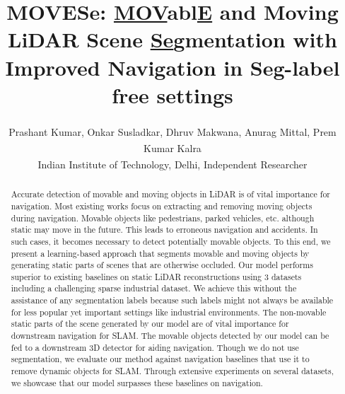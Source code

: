 \documentclass[10pt,twocolumn,letterpaper]{article}
\begin{document}
\title{MOVESe: \underline{MOV}abl\underline{E} and Moving LiDAR Scene \underline{Se}gmentation with Improved Navigation in Seg-label free settings}

\author{Prashant Kumar\textsuperscript{\rm {}}, Onkar Susladkar\textsuperscript{\rm {}}, Dhruv Makwana\textsuperscript{\rm {}}, Anurag Mittal\textsuperscript{\rm {}}, Prem Kumar Kalra\textsuperscript{\rm {}}\\
\textsuperscript{\rm {}}Indian Institute of Technology, Delhi, \textsuperscript{\rm {}}Independent Researcher \\
}

\maketitle
\ificcvfinal\thispagestyle{empty}\fi

\begin{abstract}
Accurate detection of movable and moving objects in LiDAR is of vital importance for navigation. Most existing works focus on extracting and removing moving objects during navigation. Movable objects like pedestrians, parked vehicles, etc. although static may move in the future. This leads to erroneous navigation and accidents. In such cases, it becomes necessary to detect potentially movable objects. To this end, we present a learning-based approach that segments movable and moving objects by generating static parts of scenes that are otherwise occluded. Our model performs superior to existing baselines on static LiDAR reconstructions using 3 datasets including a challenging sparse industrial dataset. We achieve this without the assistance of any segmentation labels because such labels might not always be available for less popular yet important settings like industrial environments. The non-movable static parts of the scene generated by our model are of vital importance for downstream navigation for SLAM. The movable objects detected by our model can be fed to a downstream 3D detector for aiding navigation. 
Though we do not use segmentation, we evaluate our method against navigation baselines that use it to remove dynamic objects for SLAM. 
Through extensive experiments on several datasets, we showcase that our model surpasses these baselines on navigation.
\end{abstract}
\end{document}
